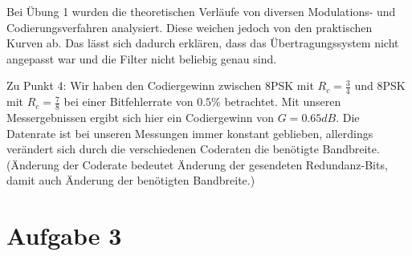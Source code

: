 \documentclass[12pt,a4paper,ngerman]{article}
\begin{document}
Bei Übung 1 wurden die theoretischen Verläufe von diversen Modulations- und Codierungsverfahren analysiert. Diese weichen jedoch von den praktischen Kurven ab. Das lässt sich dadurch erklären, dass das Übertragungssystem nicht angepasst war und die Filter nicht beliebig genau sind. 

Zu Punkt 4: Wir haben den Codiergewinn zwischen 8PSK mit $R_c = \frac{3}{4}$ und 8PSK mit $R_c = \frac{7}{8}$ bei einer Bitfehlerrate von $0.5\%$ betrachtet. Mit unseren Messergebnissen ergibt sich hier ein Codiergewinn von $G = 0.65 dB$. Die Datenrate ist bei unseren Messungen immer konstant geblieben, allerdings verändert sich durch die verschiedenen Coderaten die benötigte Bandbreite. (Änderung der Coderate bedeutet Änderung der gesendeten Redundanz-Bits, damit auch Änderung der benötigten Bandbreite.)





\pagebreak



\section{Aufgabe 3}
\end{document}
